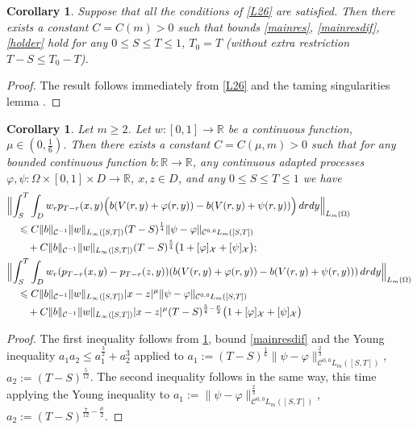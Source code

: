 \documentclass[12pt]{article}
\newtheorem{corollary}[theorem]{Corollary}
\theoremstyle{definition}
\DeclareMathOperator{\1}{\mathbbm{1}}%
\def\phi{\varphi}
\renewcommand{\ge}{\geqslant}
\renewcommand{\le}{\leqslant}
\newcommand{\nn}{\nonumber}
\newcommand{\C}{\mathcal{C}}
\newcommand{\R}{\mathbb{R}}
\newcommand{\X}{\mathcal{X}}
\begin{document}
\begin{corollary}\label{c:39}
Suppose that all the conditions of \cref{L26} are satisfied. Then there exists a constant $C=C(m)>0$ such that bounds \eqref{mainres}, \eqref{mainresdif}, \eqref{holder} hold for any $0\le S\le T\le 1$, $T_0=T$ (without extra restriction $T-S\le T_0-T$). 
\end{corollary}
\begin{proof}
The result follows immediately from \cref{L26} and the taming singularities lemma \cite[Lemma~2.3]{BFG}.
\end{proof}

\begin{corollary}\label{c:310}
Let $m\ge2$. Let $w\colon[0,1]\to\R$ be a continuous function, $\mu\in(0,\frac16)$. 
Then there exists a constant $C=C(\mu,m)>0$ such that for any bounded continuous function $b\colon\R\to\R$, any continuous adapted processes  $\phi,\psi\colon\Omega\times[0,1]\times D\to\R$, $x,z\in D$, and any $0\le S\le T\le 1$ we have 
\begin{align}%
&\Bigl\|\int_S^T \int_D w_r p_{T-r}(x,y)\Bigl(b( V(r,y)+\phi(r,y))- b( V(r,y)+\psi(r,y))\Bigr)\,dr dy\Bigr\|_{L_m(\Omega)}\nn\\
&\quad\le  C \|b\|_{\C^{-1}}\|w\|_{L_\infty([S,T])} (T-S)^{\frac14}\|\psi-\phi\|_{\C^{0,0}L_m([S,T])}\nn\\
&\qquad+ C \|b\|_{\C^{-1}}\|w\|_{L_\infty([S,T])}(T-S)^{\frac54}\bigl(1+[\phi]_{\X}+[\psi]_{\X}\bigr);\\
&\Bigl\|\int_S^T \int_D  w_r(p_{T-r}(x,y)-p_{T-r}(z,y)) (b( V(r,y)+\phi(r,y))-b( V(r,y)+\psi(r,y)))\,dr dy\Bigr\|_{L_m(\Omega)}\nn\\
&\quad\le  C \|b\|_{\C^{-1}}\|w\|_{L_\infty([S,T])} |x-z|^\mu \|\psi-\phi\|_{\C^{0,0}L_m([S,T])}\nn\\
&\qquad+ C \|b\|_{\C^{-1}} \|w\|_{L_\infty([S,T])} |x-z|^\mu (T-S)^{\frac{5}4-\frac\mu2}\bigl(1+[\phi]_{\X}+[\psi]_{\X}\bigr) \nn
 \end{align}
\end{corollary}
\begin{proof}
The first inequality follows from  \cref{c:39}, bound \eqref{mainresdif} and the Young inequality ${a_1 a_2\le  a_1^{\frac32} + a_2^3}$ applied to $a_1:=(T-S)^{\frac1{6}}\|\psi-\phi\|_{\C^{0,0}L_m([S,T])}^{\frac23}$, $a_2:=(T-S)^{\frac5{12}}$. 
The second inequality follows in the same way, this time applying the Young inequality to $a_1:=\|\psi-\phi\|_{\C^{0,0}L_m([S,T])}^{\frac23}$, $a_2:=(T-S)^{\frac7{12}-\frac\mu2}$. 
\end{proof}
\end{document}
